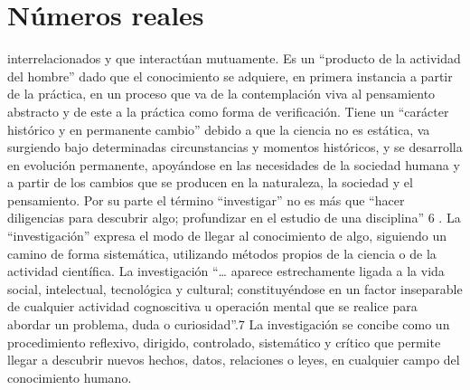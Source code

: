 \documentclass[12pt,]{krantz}
\theoremstyle{definition}
\theoremstyle{definition}
\theoremstyle{definition}
\theoremstyle{remark}
\begin{document}
\mainmatter

\hypertarget{nuxfameros-reales}{%
\chapter{Números reales}\label{nuxfameros-reales}}

interrelacionados y que interactúan mutuamente.
Es un ``producto de la actividad del hombre'' dado que el conocimiento
se adquiere, en primera instancia a partir de la práctica, en un proceso que
va de la contemplación viva al pensamiento abstracto y de este a la práctica
como forma de verificación.
Tiene un ``carácter histórico y en permanente cambio'' debido a que la
ciencia no es estática, va surgiendo bajo determinadas circunstancias y
momentos históricos, y se desarrolla en evolución permanente, apoyándose
en las necesidades de la sociedad humana y a partir de los cambios que se
producen en la naturaleza, la sociedad y el pensamiento.
Por su parte el término ``investigar'' no es más que ``hacer diligencias para
descubrir algo; profundizar en el estudio de una disciplina'' 6
.
La ``investigación''
expresa el modo de llegar al conocimiento de algo,
siguiendo un camino de forma sistemática, utilizando métodos propios de la
ciencia o de la actividad científica. La investigación ``\ldots{} aparece estrechamente
ligada a la vida social, intelectual, tecnológica y cultural; constituyéndose en un
factor inseparable de cualquier actividad cognoscitiva u operación mental que se
realice para abordar un problema, duda o curiosidad''.7
La investigación se concibe como un procedimiento reflexivo, dirigido,
controlado, sistemático y crítico que permite llegar a descubrir nuevos
hechos, datos, relaciones o leyes, en cualquier campo del conocimiento
humano.
\end{document}
